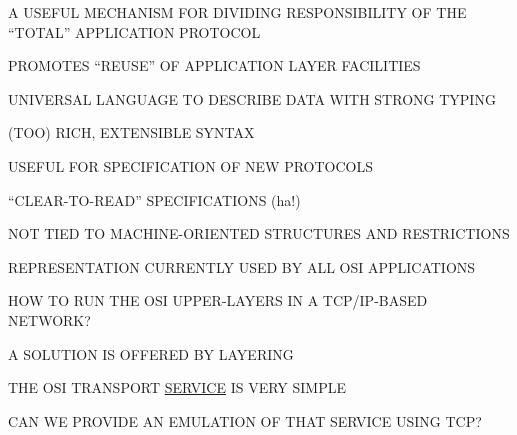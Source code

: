 \begin{bwslide}

\begin{nrtc}
\item	A USEFUL MECHANISM FOR DIVIDING RESPONSIBILITY OF THE ``TOTAL''
	APPLICATION PROTOCOL

\item	PROMOTES ``REUSE'' OF APPLICATION LAYER FACILITIES
\end{nrtc}
\end{bwslide}


\begin{bwslide}

\begin{nrtc}
\item	UNIVERSAL LANGUAGE TO DESCRIBE DATA WITH STRONG TYPING

\item	(TOO) RICH, EXTENSIBLE SYNTAX

\item	USEFUL FOR SPECIFICATION OF NEW PROTOCOLS
    \begin{nrtc}
    \item	``CLEAR-TO-READ'' SPECIFICATIONS (ha!)

    \item	NOT TIED TO MACHINE-ORIENTED STRUCTURES AND RESTRICTIONS
    \end{nrtc}

\item	REPRESENTATION CURRENTLY USED BY ALL OSI APPLICATIONS
\end{nrtc}
\end{bwslide}




\begin{bwslide}

\begin{nrtc}
\item	HOW TO RUN THE OSI UPPER-LAYERS IN A TCP/IP-BASED NETWORK?

\item	A SOLUTION IS OFFERED BY LAYERING
    \begin{nrtc}
    \item	THE OSI TRANSPORT \underline{SERVICE} IS VERY SIMPLE

    \item	CAN WE PROVIDE AN EMULATION OF THAT SERVICE USING TCP?
    \end{nrtc}
\end{nrtc}
\end{bwslide}


